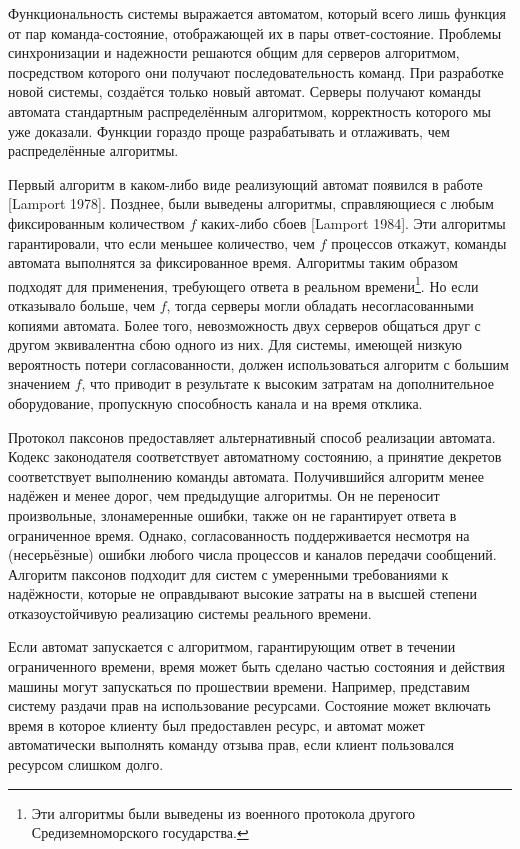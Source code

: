 \documentclass[12pt, a4paper]{article} %
\begin{document}
Функциональность системы выражается автоматом, который всего лишь функция от пар команда-состояние, отображающей их в пары ответ-состояние. Проблемы синхронизации и надежности решаются общим для серверов алгоритмом, посредством которого они получают последовательность команд. При разработке новой системы, создаётся только новый автомат. Серверы получают команды автомата стандартным распределённым алгоритмом, корректность которого мы уже доказали. Функции гораздо проще разрабатывать и отлаживать, чем распределённые алгоритмы.

Первый алгоритм в каком-либо виде реализующий автомат появился в работе [Lamport 1978]. Позднее, были выведены алгоритмы, справляющиеся с любым фиксированным количеством $f$ каких-либо сбоев [Lamport 1984]. Эти алгоритмы гарантировали, что если меньшее количество, чем $f$ процессов откажут, команды автомата выполнятся за фиксированное время. Алгоритмы таким образом подходят для применения, требующего ответа в реальном времени\footnote{Эти алгоритмы были выведены из военного протокола другого Средиземноморского государства.}. Но если отказывало больше, чем $f$, тогда серверы могли обладать несогласованными копиями автомата. Более того, невозможность двух серверов общаться друг с другом эквивалентна сбою одного из них. Для системы, имеющей низкую вероятность потери согласованности, должен использоваться алгоритм с большим значением $f$, что приводит в результате к высоким затратам на дополнительное оборудование, пропускную способность канала и на время отклика.

Протокол паксонов предоставляет альтернативный способ реализации автомата. Кодекс законодателя соответствует автоматному состоянию, а принятие декретов соответствует выполнению команды автомата. Получившийся алгоритм менее надёжен и менее дорог, чем предыдущие алгоритмы. Он не переносит произвольные, злонамеренные ошибки, также он не гарантирует ответа в ограниченное время. Однако, согласованность поддерживается несмотря на (несерьёзные) ошибки любого числа процессов и каналов передачи сообщений. Алгоритм паксонов подходит для систем с умеренными требованиями к надёжности, которые не оправдывают высокие затраты на в высшей степени отказоустойчивую реализацию системы реального времени.

Если автомат запускается с алгоритмом, гарантирующим ответ в течении ограниченного времени, время может быть сделано частью состояния и действия машины могут запускаться по прошествии времени. Например, представим систему раздачи прав на использование ресурсами. Состояние может включать время в которое клиенту был предоставлен ресурс, и автомат может автоматически выполнять команду отзыва прав, если клиент пользовался ресурсом слишком долго.
\end{document}
